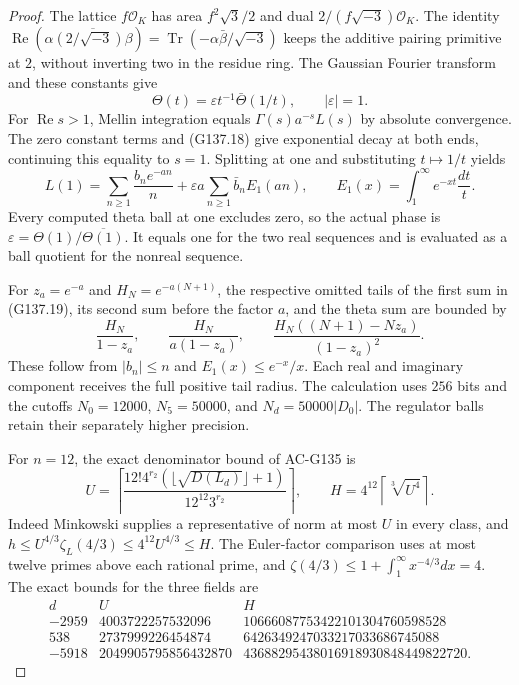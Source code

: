 \begin{proof}
The lattice $f\mathcal O_K$ has area $f^2\sqrt3/2$ and dual
$2/(f\sqrt{-3})\mathcal O_K$.  The identity
$\operatorname{Re}(\alpha\overline{(2/\sqrt{-3})\beta})
=\operatorname{Tr}(-\alpha\bar\beta/\sqrt{-3})$
keeps the additive pairing primitive at $2$, without inverting
two in the residue ring.
The Gaussian Fourier transform and these constants give
\[
       \Theta(t)=\varepsilon t^{-1}\bar\Theta(1/t),
                   \qquad |\varepsilon|=1.
 \tag{G137.18}
\]
For $\operatorname{Re}s>1$, Mellin integration equals
$\Gamma(s)a^{-s}L(s)$ by absolute convergence.
The zero constant terms and (G137.18) give exponential decay at
both ends, continuing this equality to $s=1$.
Splitting at one and substituting $t\mapsto1/t$ yields
\[
 L(1)=\sum_{n\ge1}\frac{b_ne^{-an}}n
       +\varepsilon a\sum_{n\ge1}\bar b_n E_1(an),
 \qquad E_1(x)=\int_1^\infty e^{-xt}\frac{dt}{t}.
 \tag{G137.19}
\]
Every computed theta ball at one excludes zero, so the actual
phase is $\varepsilon=\Theta(1)/\overline{\Theta(1)}$.
It equals one for the two real sequences and is evaluated as
a ball quotient for the nonreal sequence.

For $z_a=e^{-a}$ and $H_N=e^{-a(N+1)}$, the respective omitted
tails of the first sum in (G137.19), its second sum before the
factor $a$, and the theta sum are bounded by
\[
 \frac{H_N}{1-z_a},\qquad
 \frac{H_N}{a(1-z_a)},\qquad
 \frac{H_N((N+1)-Nz_a)}{(1-z_a)^2}.
 \tag{G137.20}
\]
These follow from $|b_n|\le n$ and $E_1(x)\le e^{-x}/x$.
Each real and imaginary component receives the full positive
tail radius.  The calculation uses $256$ bits and the cutoffs
$N_0=12000$, $N_5=50000$, and $N_d=50000|D_0|$.
The regulator balls retain their separately higher precision.

For $n=12$, the exact denominator bound of AC-G135 is
\[
 U=\left\lceil\frac{12!4^{r_2}(\lfloor\sqrt{D(L_d)}\rfloor+1)}
                         {12^{12}3^{r_2}}\right\rceil,
 \qquad H=4^{12}\left\lceil\sqrt[3]{U^4}\right\rceil.
 \tag{G137.21}
\]
Indeed Minkowski supplies a representative of norm at most $U$
in every class, and
$h\le U^{4/3}\zeta_L(4/3)\le4^{12}U^{4/3}\le H$.
The Euler-factor comparison uses at most twelve primes above
each rational prime, and
$\zeta(4/3)\le1+\int_1^\infty x^{-4/3}dx=4$.
The exact bounds for the three fields are
\[
\begin{array}{c|r|r}
d&U&H\\\hline
-2959&4003722257532096&10666087753422101304760598528\\
538&2737999226454874&6426349247033217033686745088\\
-5918&2049905795856432870&43688295438016918930848449822720.
\end{array}
\tag{G137.22}
\]


\end{proof}
